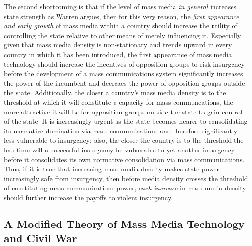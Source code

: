 \documentclass[11pt,article,oneside]{memoir}
\begin{document}
The second shortcoming is that if the level of mass media \emph{in
general} increases state strength as Warren argues, then for this very
reason, the \emph{first appearance and early growth} of mass media
within a country should increase the utility of controlling the state
relative to other means of merely influencing it. Especially given that
mass media density is non-stationary and trends upward in every country
in which it has been introduced, the first appearance of mass media
technology should increase the incentives of opposition groups to risk
insurgency before the development of a mass communications system
significantly increases the power of the incumbent and decreaes the
power of opposition groups outside the state. Additionally, the closer a
country's mass media density is to the threshold at which it will
constitute a capacity for mass communcations, the more attractive it
will be for opposition groups outside the state to gain control of the
state. It is increasingly urgent as the state becomes nearer to
consolidating its normative domination via mass communications and
therefore significantly less vulnerable to insurgency; also, the closer
the country is to the threshold the less time will a successful
insurgency be vulnerable to yet another insurgency before it
consolidates its own normative consolidation via mass communications.
Thus, if it is true that increasing mass media density makes state power
increasingly safe from insurgency, then before media density crosses the
threshold of constituting mass communications power, \emph{each
increase} in mass media density should further increase the payoffs to
violent insurgency.

\subsection{A Modified Theory of Mass Media Technology and Civil
War}\label{a-modified-theory-of-mass-media-technology-and-civil-war}
\end{document}

